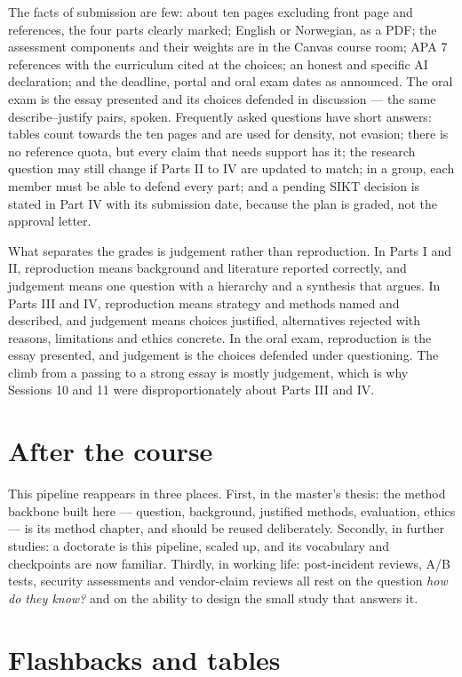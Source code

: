\documentclass[11pt,a4paper,british,twoside=false,headings=small,chapterprefix=false,numbers=noenddot]{scrbook}
\begin{document}
The facts of submission are few: about ten pages excluding front page and references, the four parts clearly marked; English or Norwegian, as a PDF; the assessment components and their weights are in the Canvas course room; APA 7 references with the curriculum cited at the choices; an honest and specific AI declaration; and the deadline, portal and oral exam dates as announced. The oral exam is the essay presented and its choices defended in discussion --- the same describe--justify pairs, spoken. Frequently asked questions have short answers: tables count towards the ten pages and are used for density, not evasion; there is no reference quota, but every claim that needs support has it; the research question may still change if Parts II to IV are updated to match; in a group, each member must be able to defend every part; and a pending SIKT decision is stated in Part IV with its submission date, because the plan is graded, not the approval letter.

What separates the grades is judgement rather than reproduction. In Parts I and II, reproduction means background and literature reported correctly, and judgement means one question with a hierarchy and a synthesis that argues. In Parts III and IV, reproduction means strategy and methods named and described, and judgement means choices justified, alternatives rejected with reasons, limitations and ethics concrete. In the oral exam, reproduction is the essay presented, and judgement is the choices defended under questioning. The climb from a passing to a strong essay is mostly judgement, which is why Sessions 10 and 11 were disproportionately about Parts III and IV.

\section{After the course}

This pipeline reappears in three places. First, in the master's thesis: the method backbone built here --- question, background, justified methods, evaluation, ethics --- is its method chapter, and should be reused deliberately. Secondly, in further studies: a doctorate is this pipeline, scaled up, and its vocabulary and checkpoints are now familiar. Thirdly, in working life: post-incident reviews, A/B tests, security assessments and vendor-claim reviews all rest on the question \emph{how do they know?} and on the ability to design the small study that answers it.


\section{Flashbacks and tables}
\end{document}
